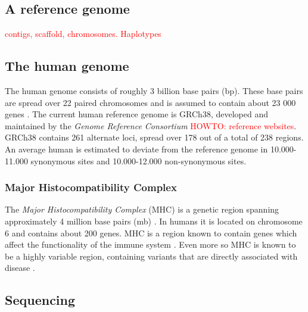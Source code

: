\documentclass[thesis.tex]{subfiles}
\begin{document}
\subsection{A reference genome}
\textcolor{red}{contigs, scaffold, chromosomes. Haplotypes}
\subsection{The human genome}
The human genome consists of roughly 3 billion base pairs (bp). These base pairs are spread over 22 paired chromosomes and is assumed to contain about 23 000 genes \cite{introduction_to_genomics}. The current human reference genome is GRCh38, developed and maintained by the \textit{Genome Reference Consortium} \textcolor{red}{HOWTO: reference websites}. GRCh38 contains 261 alternate loci, spread over 178 out of a total of 238 regions. An average human is estimated to deviate from the reference genome in 10.000-11.000 synonymous sites and 10.000-12.000 non-synonymous sites.
\subsubsection{Major Histocompatibility Complex}
The \textit{Major Histocompatibility Complex} (MHC) is a genetic region spanning approximately 4 million base pairs (mb) \cite{immunobiology_the_immune_system_in_health_and_disease}. In humans it is located on chromosome 6 and contains about 200 genes. MHC is a region known to contain genes which affect the functionality of the immune system \cite{the_importance_of_immune_gene_variability_in_evolutionary_ecology_and_conservation}. Even more so MHC is known to be a highly variable region, containing variants that are directly associated with disease \cite{variation_analysis_and_gene_annotation_of_eight_mhc_haplotypes}.
\subsection{Sequencing}
\end{document}
